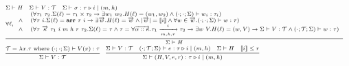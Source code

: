 \documentclass[fleqn]{article}
\begin{document}
\[
\scriptsize
\begin{array}{l}
	\Sigma \vdash H \hspace{1em} \Sigma \vdash V : \mathcal{T} \hspace{1em} \Sigma \vdash \sigma : \tau \triangleright i \mid (m, h) \\
	\infer{\Sigma \vdash H}{\forall \ell, \begin{array}{cl} & (\forall \tau_1~\tau_2. \Sigma(\ell) = \tau_1 \times \tau_2 \rightarrow \exists w_1~w_2. H(\ell) = (w_1,w_2) \land (\cdot;\cdot;\Sigma) \vdash w_i : \tau_i ) \\ \land & (\forall \tau~i. \Sigma(\ell)= \mathbf{arr}~\tau~i \rightarrow \exists \overrightarrow{w}. H(\ell) = \overrightarrow{w} \land |\overrightarrow{w}| = \llbracket i \rrbracket \land \forall w \in \overrightarrow{w}. (\cdot;\cdot;\Sigma) \vdash w : \tau  ) \\ \land & (\forall \tau~\overrightarrow{\kappa}~\tau_1~i~m~h~r~\tau_2. \Sigma(\ell)=\tau \land \tau=\forall \overrightarrow{\alpha::\kappa}. \tau_1 \xrightarrow[m,h,r]{i} \tau_2 \rightarrow \exists w~V. H(\ell) = (w, V) \rightarrow \Sigma \vdash V : \mathcal{T} \land (\cdot;\mathcal{T};\Sigma) \vdash w : \tau ) \end{array} } \\
	\infer{\Sigma \vdash V : \mathcal{T}}{\mathcal{T} = \lambda x. \tau \mathrm{~where~} (\cdot;\cdot;\Sigma) \vdash V(x) : \tau   } \hspace{1em}
	\infer{\Sigma \vdash (H,V,e,r) : \tau \triangleright i \mid (m, h)}{\Sigma \vdash V : \mathcal{T} & (\cdot;\mathcal{T};\Sigma) \vdash e : \tau \triangleright i \mid (m,h) & \Sigma \vdash H & \llbracket i \rrbracket \le r}
\end{array}
\]
\end{document}
